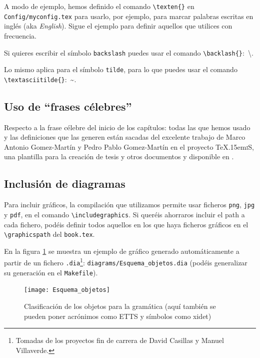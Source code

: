 \documentclass[spanish,openright]{book}
\def\texis{\TeX \raise.15em\hbox{\textsc{i}}S}
\DeclareRobustCommand{\texten}[1]{\textit{#1}}
\begin{document}
A modo de ejemplo, hemos definido el comando
\texttt{\textbackslash{}texten\{\}} en \texttt{Config/myconfig.tex} para
usarlo, por ejemplo, para marcar palabras escritas en inglés (aka
\texten{English}). Sigue el ejemplo para definir aquellos que utilices
con frecuencia.

Si quieres escribir el símbolo \texttt{backslash} puedes usar el comando
\texttt{\textbackslash{}backlash\{\}}:~\textbackslash{}.

Lo mismo aplica para el símbolo \texttt{tilde}, para lo que puedes usar
el comando \texttt{\textbackslash{}textasciitilde\{\}}:~\textasciitilde{}.


\subsection{Uso de ``frases célebres''}
\label{sec:uso-de-frases}

Respecto a la frase célebre del inicio de los capítulos: todas las que
hemos usado y las definiciones que las generen están sacadas del
excelente trabajo de Marco Antonio Gomez-Martín y Pedro Pablo
Gomez-Martín en el proyecto \texis, una plantilla para la creación de
tesis y otros documentos y disponible en \cite{texis}.


\subsection{Inclusión de diagramas}
\label{sec:diagrama}

Para incluir gráficos, la compilación que utilizamos permite usar
ficheros \texttt{png}, \texttt{jpg} y \texttt{pdf}, en el comando
\texttt{\textbackslash{}includegraphics}. Si queréis ahorraros incluir
el path a cada fichero, podéis definir todos aquellos en los que haya
ficheros gráficos en el \texttt{\textbackslash{}graphicspath} del
\texttt{book.tex}.

En la figura \ref{fig:fig_clobj} se muestra un ejemplo de gráfico
generado automáticamente a partir de un fichero
\texttt{.dia}\footnote{Tomadas de los proyectos fin de carrera de David
Casillas y Manuel Villaverde.}: \texttt{diagrams/Esquema\_objetos.dia}
(podéis generalizar su generación en el \texttt{Makefile}).

\begin{figure}[tphb]
\centering
\texttt{[image: Esquema\_objetos]}
\caption{Clasificación de los objetos para la gramática (aquí también
se pueden poner acrónimos como \acs{ETTS} y símbolos como \ac{xidet})}
\label{fig:fig_clobj}
\end{figure}
\end{document}
